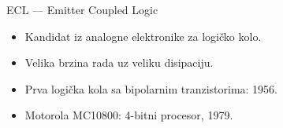 \begin{frame}[label=10-s081]{ECL — Emitter Coupled Logic}
\setlength{\abovedisplayskip}{4pt}\setlength{\belowdisplayskip}{4pt}\setlength{\abovedisplayshortskip}{3pt}\setlength{\belowdisplayshortskip}{3pt}
\bigskip
\begin{itemize}\item Kandidat iz analogne elektronike za logičko kolo.\item Velika brzina rada uz veliku disipaciju.\item Prva logička kola sa bipolarnim tranzistorima: 1956.\item Motorola MC10800: 4-bitni procesor, 1979.\end{itemize}
\end{frame}
